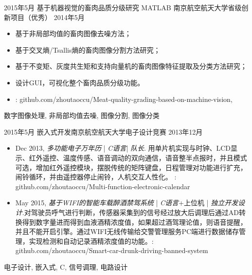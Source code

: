 \begin{experiences}
  \emptySeparator
  \experience
    {2015年5月}   {基于机器视觉的畜肉品质分级研究 MATLAB}{ 南京航空航天大学}{省级创新项目（优秀）}
    {2014年5月} {
                      \begin{itemize}
                        \item 基于非局部均值的畜肉图像去噪方法；
                        \item 基于交叉熵/Tsallis熵的畜肉图像分割方法研究；
                        \item 基于不变矩、灰度共生矩和支持向量机的畜肉图像特征提取及分类方法研究；
				   \item 设计GUI，可视化整个畜肉品质分级功能。
                        \item \faGithub:  {github.com/zhoutaoccu/Meat-quality-grading-based-on-machine-vision}, 
                      \end{itemize}
                    }
                    {数字图像处理, 非局部均值去噪, 图像分割, 图像分类}

  \emptySeparator 
  \experience
  {2015年5月} {嵌入式开发}{南京航空航天大学}{电子设计竞赛}
  {2013年12月}    {
				  	\begin{itemize}
				  		\item Dec 2013, \emph{多功能电子万年历} | \emph{C语言}| \emph{队长}. 
				  		用单片机实现与时钟、LCD显示、红外遥控、温度传感、语音调动的双向通信，语音整半点报时，并且模式可选，增加红外遥控模块，摆脱传统的矩阵键盘，日程管理对功能进行扩充，闹铃循环，并由遥控器停止闹铃，人机交互人性化。 \faGithub:  {github.com/zhoutaoccu/Multi-function-electronic-calendar}                                                                      
				  		\item May 2015, \emph{基于WIFI的智能车载醉酒禁驾系统} | \emph{C语言}+上位机 | \emph{独立开发设计}.对驾驶员呼气进行判断，传感器采集到的信号经过放大后调理后通过AD转换得到数字量进而得到血液酒精浓度值，如果超过酒驾理论值，则语音提醒，并且不能开启引擎。通过WIFI无线传输给交警管理服务PC端进行数据储存管理，实现检测和自动记录酒精浓度值的功能。\faGithub:  {github.com/zhoutaoccu/Smart-car-drunk-driving-banned-system}
				  	\end{itemize}
				  }
				  {电子设计, 嵌入式, C, 信号调理, 电路设计}
		
\end{experiences}
